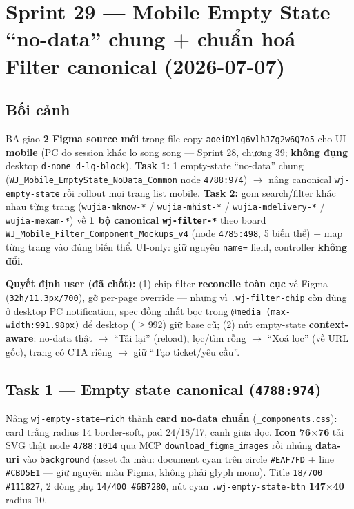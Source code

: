 \chapter{Sprint 29 --- Mobile Empty State ``no-data'' chung + chuẩn hoá Filter canonical (2026-07-07)}

\section{Bối cảnh}

BA giao \textbf{2 Figma source mới} trong file copy \texttt{aoeiDYlg6vlhJZg2w6Q7o5} cho UI \textbf{mobile} (PC do session khác lo song song --- Sprint 28, chương 39; \textbf{không đụng} desktop \texttt{d-none d-lg-block}). \textbf{Task 1:} 1 empty-state ``no-data'' chung (\texttt{WJ\_Mobile\_EmptyState\_NoData\_Common} node \texttt{4788:974}) $\rightarrow$ nâng canonical \texttt{wj-empty-state} rồi rollout mọi trang list mobile. \textbf{Task 2:} gom search/filter khác nhau từng trang (\texttt{wujia-mknow-*} / \texttt{wujia-mhist-*} / \texttt{wujia-mdelivery-*} / \texttt{wujia-mexam-*}) về \textbf{1 bộ canonical \texttt{wj-filter-*}} theo board \texttt{WJ\_Mobile\_Filter\_Component\_Mockups\_v4} (node \texttt{4785:498}, 5 biến thể) + map từng trang vào đúng biến thể. UI-only: giữ nguyên \texttt{name=} field, controller \textbf{không đổi}.

\textbf{Quyết định user (đã chốt):} (1) chip filter \textbf{reconcile toàn cục} về Figma (\texttt{32h/11.3px/700}), gỡ per-page override --- nhưng vì \texttt{.wj-filter-chip} còn dùng ở desktop PC notification, spec đồng nhất bọc trong \texttt{@media (max-width:991.98px)} để desktop ($\geq$992) giữ base cũ; (2) nút empty-state \textbf{context-aware}: no-data thật $\rightarrow$ ``Tải lại'' (reload), lọc/tìm rỗng $\rightarrow$ ``Xoá lọc'' (về URL gốc), trang có CTA riêng $\rightarrow$ giữ ``Tạo ticket/yêu cầu''.

\section{Task 1 --- Empty state canonical (\texttt{4788:974})}

Nâng \texttt{wj-empty-state--rich} thành \textbf{card no-data chuẩn} (\texttt{\_components.css}): card trắng radius 14 border-soft, pad 24/18/17, canh giữa dọc. \textbf{Icon 76$\times$76} tải SVG thật node \texttt{4788:1014} qua MCP \texttt{download\_figma\_images} rồi nhúng \textbf{data-uri} vào \texttt{background} (asset đa màu: document cyan trên circle \texttt{\#EAF7FD} + line \texttt{\#CBD5E1} --- giữ nguyên màu Figma, không phải glyph mono). Title \texttt{18/700 \#111827}, 2 dòng phụ \texttt{14/400 \#6B7280}, nút cyan \texttt{.wj-empty-state-btn} \textbf{147$\times$40} radius 10.

